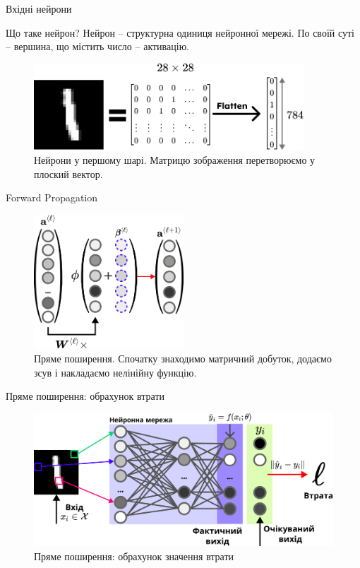 \documentclass[xcolor={usenames,dvipsnames}]{beamer}
\begin{document}
    \begin{frame}{Вхідні нейрони}
        \begin{block}{Що таке нейрон?}
            Нейрон -- структурна одиниця нейронної мережі. По своїй суті -- вершина, що містить число -- активацію.
        \end{block}
    
        \begin{figure}
            \centering
            \includegraphics[width=0.9\textwidth]{images/flatten.png}
            \caption{Нейрони у першому шарі. Матрицю зображення перетворюємо у плоский вектор.}
        \end{figure}
    \end{frame}
    \begin{frame}{Forward Propagation}
        \begin{figure}
            \centering
            \includegraphics[width=0.5\textwidth]{images/forward_prop.png}
            \caption{Пряме поширення. Спочатку знаходимо матричний добуток, додаємо зсув і накладаємо нелінійну функцію.}
        \end{figure}
    \end{frame}

    \begin{frame}{Пряме поширення: обрахунок втрати}

    \begin{figure}
        \centering
        \includegraphics[width=\textwidth]{images/full_forward_prop.png}
        \caption{Пряме поширення: обрахунок значення втрати}
    \end{figure}

    \end{frame}
\end{document}
